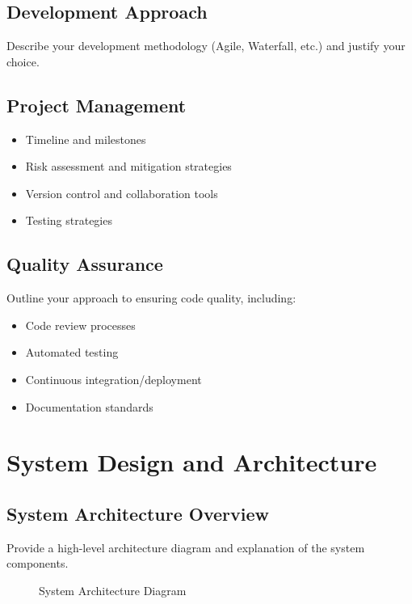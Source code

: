 \documentclass[12pt,a4paper]{article}
\begin{document}
\subsection{Development Approach}
Describe your development methodology (Agile, Waterfall, etc.) and justify your choice.

\subsection{Project Management}
\begin{itemize}
    \item Timeline and milestones
    \item Risk assessment and mitigation strategies
    \item Version control and collaboration tools
    \item Testing strategies
\end{itemize}

\subsection{Quality Assurance}
Outline your approach to ensuring code quality, including:
\begin{itemize}
    \item Code review processes
    \item Automated testing
    \item Continuous integration/deployment
    \item Documentation standards
\end{itemize}

\section{System Design and Architecture}
\label{sec:system-design}

\subsection{System Architecture Overview}
Provide a high-level architecture diagram and explanation of the system components.

\begin{figure}[H]
    \centering
    \caption{System Architecture Diagram}
    \label{fig:system-architecture}
\end{figure}
\end{document}
